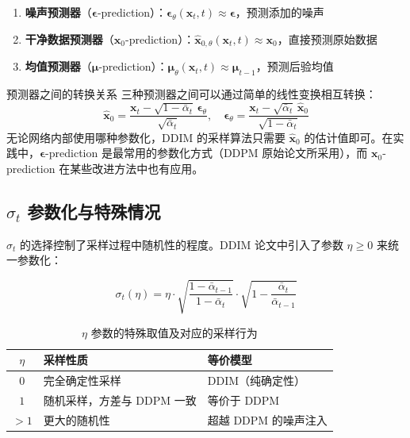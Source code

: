 \begin{enumerate}
    \item \textbf{噪声预测器}（$\boldsymbol{\epsilon}$-prediction）：$\boldsymbol{\epsilon}_\theta(\mathbf{x}_t, t) \approx \boldsymbol{\epsilon}$，预测添加的噪声
    \item \textbf{干净数据预测器}（$\mathbf{x}_0$-prediction）：$\hat{\mathbf{x}}_{0,\theta}(\mathbf{x}_t, t) \approx \mathbf{x}_0$，直接预测原始数据
    \item \textbf{均值预测器}（$\boldsymbol{\mu}$-prediction）：$\boldsymbol{\mu}_\theta(\mathbf{x}_t, t) \approx \boldsymbol{\mu}_{t-1}$，预测后验均值
\end{enumerate}

\begin{knowledgebox}{预测器之间的转换关系}
三种预测器之间可以通过简单的线性变换相互转换：
$$
\hat{\mathbf{x}}_0 = \frac{\mathbf{x}_t - \sqrt{1-\bar{\alpha}_t}\,\boldsymbol{\epsilon}_\theta}{\sqrt{\bar{\alpha}_t}}, \quad
\boldsymbol{\epsilon}_\theta = \frac{\mathbf{x}_t - \sqrt{\bar{\alpha}_t}\,\hat{\mathbf{x}}_0}{\sqrt{1-\bar{\alpha}_t}}
$$
无论网络内部使用哪种参数化，DDIM 的采样算法只需要 $\hat{\mathbf{x}}_0$ 的估计值即可。在实践中，$\boldsymbol{\epsilon}$-prediction 是最常用的参数化方式（DDPM 原始论文所采用），而 $\mathbf{x}_0$-prediction 在某些改进方法中也有应用。
\end{knowledgebox}

\subsection{$\sigma_t$ 参数化与特殊情况}

$\sigma_t$ 的选择控制了采样过程中随机性的程度。DDIM 论文中引入了参数 $\eta \geq 0$ 来统一参数化：

$$
\sigma_t(\eta) = \eta \cdot \sqrt{\frac{1-\bar{\alpha}_{t-1}}{1-\bar{\alpha}_t}} \cdot \sqrt{1 - \frac{\bar{\alpha}_t}{\bar{\alpha}_{t-1}}}
$$

\begin{table}[H]
\centering
\caption{$\eta$ 参数的特殊取值及对应的采样行为}
\begin{tabular}{cll}
\toprule
$\eta$ & \textbf{采样性质} & \textbf{等价模型} \\
\midrule
$0$ & 完全确定性采样 & DDIM（纯确定性） \\
$1$ & 随机采样，方差与 DDPM 一致 & 等价于 DDPM \\
$>1$ & 更大的随机性 & 超越 DDPM 的噪声注入 \\
\bottomrule
\end{tabular}
\end{table}

